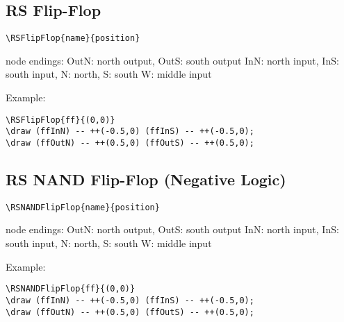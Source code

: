 \documentclass[parskip=full]{scrartcl}
\begin{document}
\subsection{RS Flip-Flop}

\begin{verbatim}
\RSFlipFlop{name}{position}
\end{verbatim}
node endings: OutN: north output, OutS: south output
              InN: north input, InS: south input,
              N: north, S: south
              W: middle input

Example:\\
\begin{minipage}{0.8\textwidth}
\begin{verbatim}
\RSFlipFlop{ff}{(0,0)}
\draw (ffInN) -- ++(-0.5,0) (ffInS) -- ++(-0.5,0);
\draw (ffOutN) -- ++(0.5,0) (ffOutS) -- ++(0.5,0);
\end{verbatim}
\end{minipage}
\begin{minipage}{0.19\textwidth}
\end{minipage}

\subsection{RS NAND Flip-Flop (Negative Logic)}

\begin{verbatim}
\RSNANDFlipFlop{name}{position}
\end{verbatim}
node endings: OutN: north output, OutS: south output
              InN: north input, InS: south input,
              N: north, S: south
              W: middle input

Example:\\
\begin{minipage}{0.8\textwidth}
\begin{verbatim}
\RSNANDFlipFlop{ff}{(0,0)}
\draw (ffInN) -- ++(-0.5,0) (ffInS) -- ++(-0.5,0);
\draw (ffOutN) -- ++(0.5,0) (ffOutS) -- ++(0.5,0);
\end{verbatim}
\end{minipage}
\begin{minipage}{0.19\textwidth}
\end{minipage}
\end{document}

